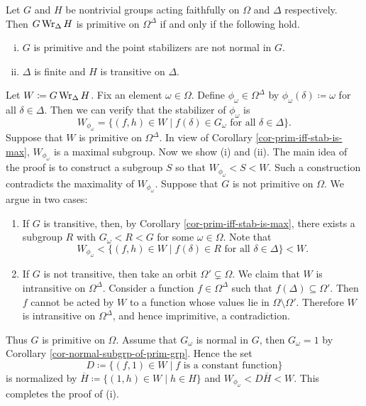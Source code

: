 \begin{proposition}
	Let $G$ and $H$ be nontrivial groups acting faithfully on $\Omega$ and $\Delta$ respectively. Then $G\operatorname{Wr}_{\Delta} H$ is primitive on $\Omega^\Delta$ if and only if the following hold.
\begin{enumerate}[(i)]
	\item $G$ is primitive and the point stabilizers are not normal in $G$.
	\item $\Delta$ is finite and $H$ is transitive on $\Delta$.
\end{enumerate}
\end{proposition}
\begin{sketch}
	Let $W\coloneq G\operatorname{Wr}_{\Delta} H$.  Fix an element $\omega\in\Omega$. Define $\phi_\omega\in \Omega^\Delta$ by $\phi_\omega(\delta) \coloneq \omega$ for all $\delta\in \Delta$. Then we can verify that the stabilizer of $\phi_{\omega}$ is 
	\begin{equation*}
		W_{\phi_{\omega}} = \{(f,h)\in W\mid f(\delta)\in G_\omega \text{ for all }\delta\in\Delta\}.
	\end{equation*}
	Suppose that $W$ is primitive on $\Omega^\Delta$. In view of Corollary \ref{cor-prim-iff-stab-is-max}, $W_{\phi_{\omega}}$ is a maximal subgroup.
Now we show (i) and (ii). The main idea of the proof is to construct a subgroup $S$ so that $W_{\phi_\omega}< S <W$. Such a construction contradicts the maximality of $W_{\phi_\omega}$. Suppose that $G$ is not primitive on $\Omega$. We argue in two cases:
\begin{enumerate}[(1)]
	\item If $G$ is transitive, then, by Corollary \ref{cor-prim-iff-stab-is-max}, there exists a subgroup $R$ with $G_\omega< R < G$ for some $\omega\in\Omega$. Note that 
	\begin{equation*}
		W_{\phi_{\omega}} < \{(f,h)\in W\mid f(\delta)\in R \text{ for all }\delta\in\Delta\} < W.
	\end{equation*}
	\item If $G$ is not transitive, then take an orbit $\Omega'\subsetneq \Omega$. We claim that $W$ is intransitive on $\Omega^\Delta$. Consider a  function $f\in\Omega^{\Delta}$ such that $f(\Delta)\subseteq \Omega'$. Then $f$ cannot be acted by $W$ to a function whose values lie in $\Omega\setminus \Omega'$. Therefore $W$ is intransitive on $\Omega^\Delta$, and hence imprimitive, a contradiction.
\end{enumerate}
Thus $G$ is primitive on $\Omega$. Assume that $G_\omega$ is normal in $G$, then $G_\omega = 1$ by Corollary \ref{cor-normal-subgrp-of-prim-grp}.  Hence the set
\begin{equation*}
	D\coloneq\{(f,1)\in W \mid \text{$f$ is a constant function}\}
\end{equation*}
is normalized by $\overline{H} \coloneq \{(1,h)\in W\mid h\in H\}$ and $W_{\phi_\omega} < D\overline{H} < W$. This completes the proof of (i).


\end{sketch}

